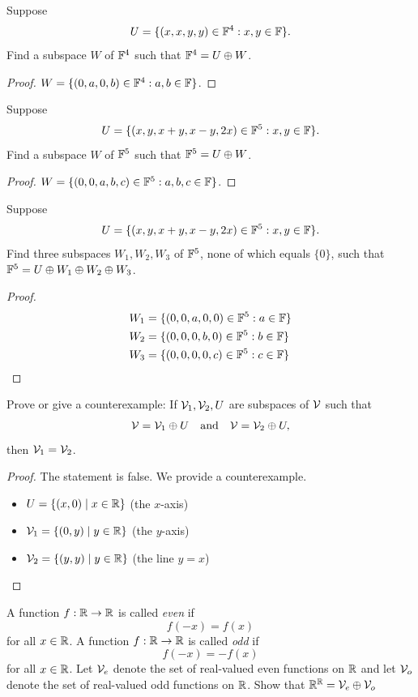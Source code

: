 \begin{question}
	Suppose
	\[ U = \{(x, x, y, y) \in \mathbb{F}^4 : x, y \in \mathbb{F}\}. \]
	Find a subspace $W$ of $\mathbb{F}^4$ such that $\mathbb{F}^4 = U \oplus W$.
\end{question}
\begin{proof}
	$W = \{(0, a, 0, b) \in \mathbb{F}^4 : a, b \in \mathbb{F}\}$.
\end{proof}
\begin{question}
	Suppose
	\[ U = \{(x, y, x + y, x - y, 2x) \in \mathbb{F}^5 : x, y \in \mathbb{F}\}. \]
	Find a subspace $W$ of $\mathbb{F}^5$ such that $\mathbb{F}^5 = U \oplus W$.
\end{question}
\begin{proof}
	$W = \{(0, 0, a, b, c) \in \mathbb{F}^5 : a, b, c \in \mathbb{F}\}$.
\end{proof}
\begin{question}
	Suppose
	\[ U = \{(x, y, x + y, x - y, 2x) \in \mathbb{F}^5 : x, y \in \mathbb{F}\}. \]
	Find three subspaces $W_1, W_2, W_3$ of $\mathbb{F}^5$, none of which equals $\{0\}$, such that $\mathbb{F}^5 = U \oplus W_1 \oplus W_2 \oplus W_3$.
\end{question}
\begin{proof}
	\begin{align*}
		W_1 &= \{(0, 0, a, 0, 0) \in \mathbb{F}^5 : a \in \mathbb{F}\} \\
		W_2 &= \{(0, 0, 0, b, 0) \in \mathbb{F}^5 : b \in \mathbb{F}\} \\
		W_3 &= \{(0, 0, 0, 0, c) \in \mathbb{F}^5 : c \in \mathbb{F}\}
	\end{align*}
\end{proof}
\begin{question}
	Prove or give a counterexample: If $\mathcal{V}_1, \mathcal{V}_2, U$ are subspaces of $\mathcal{V}$ such that
	\[ \mathcal{V} = \mathcal{V}_1 \oplus U \quad \text{and} \quad \mathcal{V} = \mathcal{V}_2 \oplus U, \]
	then $\mathcal{V}_1 = \mathcal{V}_2$.
\end{question}
\begin{proof}
	The statement is false. We provide a counterexample.
	\begin{itemize}
		\item $U = \{(x, 0) \mid x \in \mathbb{R}\}$ (the $x$-axis)
		\item $\mathcal{V}_1 = \{(0, y) \mid y \in \mathbb{R}\}$ (the $y$-axis)
		\item $\mathcal{V}_2 = \{(y, y) \mid y \in \mathbb{R}\}$ (the line $y = x$)
	\end{itemize}
\end{proof}
\begin{question}
	A function $f : \mathbb{R} \to \mathbb{R}$ is called \textit{even} if
	\[ f(-x) = f(x) \]
	for all $x \in \mathbb{R}$. A function $f : \mathbb{R} \to \mathbb{R}$ is called \textit{odd} if
	\[ f(-x) = -f(x) \]
	for all $x \in \mathbb{R}$. Let $\mathcal{V}_e$ denote the set of real-valued even functions on $\mathbb{R}$ and let $\mathcal{V}_o$ denote the set of real-valued odd functions on $\mathbb{R}$. Show that $\mathbb{R}^{\mathbb{R}} = \mathcal{V}_e \oplus \mathcal{V}_o$
\end{question}
